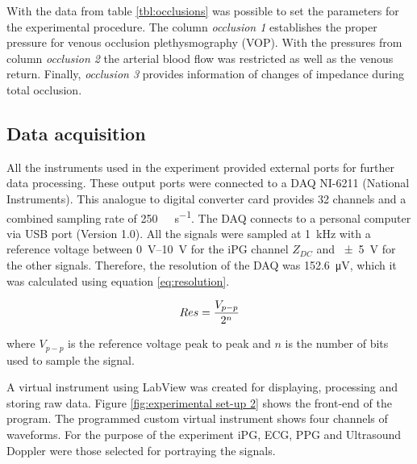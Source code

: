 With the data from table \ref{tbl:occlusions} was possible to set the parameters for the experimental procedure. The column \textit{occlusion 1} establishes the proper pressure for venous occlusion plethysmography (VOP). With the pressures from column \textit{occlusion 2} the arterial blood flow was restricted as well as the venous return. Finally, \textit{occlusion 3} provides information of changes of impedance during total occlusion.

\subsection{Data acquisition}
\label{section procedure 1.4}

All the instruments used in the experiment provided external ports for further data processing. These output ports were connected to a DAQ NI-6211 (National Instruments). This analogue to digital converter card provides 32 channels and a combined sampling rate of \SI{250}{\kilo\sample\per\second}. The DAQ connects to a personal computer via USB port (Version 1.0). All the signals were sampled at \SI{1}{\kilo\hertz} with a reference voltage between \SIrange{0}{10}{\volt} for the iPG channel $Z_{DC}$ and \SI{\pm 5}{\volt} for the other signals. Therefore, the resolution of the DAQ was \SI{152.6}{\micro\volt}, which it was calculated using equation \ref{eq:resolution}. 

\begin{align}
	\label{eq:resolution}
	Res =\frac{V_{p-p}}{2^{n}}		\tagaddtext{[\si{\volt}]}
\end{align}

where $V_{p-p}$ is the reference voltage peak to peak and $n$ is the number of bits used to sample the signal. 

A virtual instrument using LabView \cite{LabView:2016} was created for displaying, processing and storing raw data. Figure \ref{fig:experimental set-up 2} shows the front-end of the program. The programmed custom virtual instrument shows four channels of waveforms. For the purpose of the experiment iPG, ECG, PPG and Ultrasound Doppler were those selected for portraying the signals.


